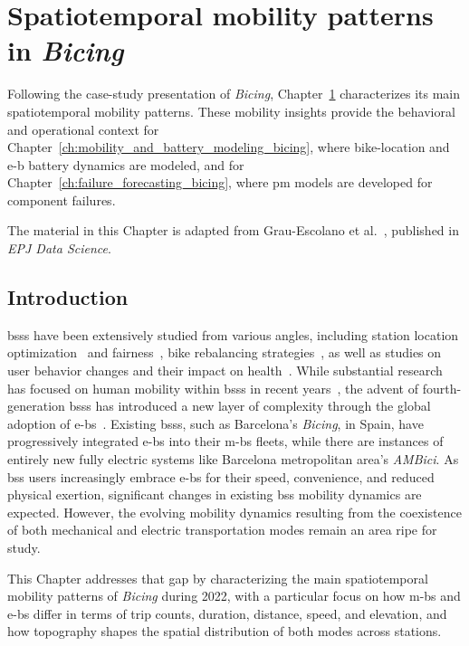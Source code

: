 \chapter{Spatiotemporal mobility patterns in \textit{Bicing}} \label{ch:bicing_mobility_patterns}

Following the case-study presentation of \textit{Bicing}, Chapter~\ref{ch:bicing_mobility_patterns} characterizes its main spatiotemporal mobility patterns. These mobility insights provide the behavioral and operational context for Chapter~\ref{ch:mobility_and_battery_modeling_bicing}, where bike-location and \ac{e-b} battery dynamics are modeled, and for Chapter~\ref{ch:failure_forecasting_bicing}, where \ac{pm} models are developed for component failures.

The material in this Chapter is adapted from Grau-Escolano et al.~\cite{Grau-Escolano2024}, published in \textit{EPJ Data Science}.

\section{Introduction}

\acp{bss} have been extensively studied from various angles, including station location optimization~\cite{Liu2015} and fairness~\cite{DuranRodas2020}, bike rebalancing strategies~\cite{Chardon2016}, as well as studies on user behavior changes and their impact on health~\cite{Ma2020, Qiu2018}. While substantial research has focused on human mobility within \acp{bss} in recent years~\cite{Talavera_Garcia2021, Kon2021}, the advent of fourth-generation \acp{bss} has introduced a new layer of complexity through the global adoption of \acp{e-b}~\cite{Shaheen2010, MeddinWorldMapReport2022}. Existing \acp{bss}, such as Barcelona's \textit{Bicing}, in Spain, have progressively integrated \acp{e-b} into their \acp{m-b} fleets, while there are instances of entirely new fully electric systems like Barcelona metropolitan area's \textit{AMBici}. As \ac{bss} users increasingly embrace \acp{e-b} for their speed, convenience, and reduced physical exertion, significant changes in existing \ac{bss} mobility dynamics are expected. However, the evolving mobility dynamics resulting from the coexistence of both mechanical and electric transportation modes remain an area ripe for study.

This Chapter addresses that gap by characterizing the main spatiotemporal mobility patterns of \textit{Bicing} during 2022, with a particular focus on how \acp{m-b} and \acp{e-b} differ in terms of trip counts, duration, distance, speed, and elevation, and how topography shapes the spatial distribution of both modes across stations.

